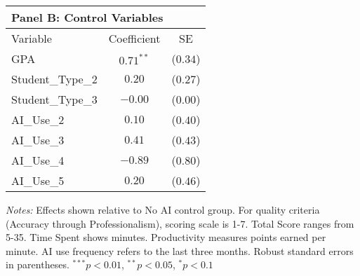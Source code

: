 \begin{table}[!htbp]
\vspace{0.3cm}

\begin{tabular}{lcc}
\multicolumn{3}{l}{\textbf{Panel B: Control Variables}} \\
\hline\hline
Variable & Coefficient & SE \\
\hline
GPA & $0.71^{**}$ & ($0.34$) \\
Student_Type_2 & $0.20$ & ($0.27$) \\
Student_Type_3 & $-0.00$ & ($0.00$) \\
AI_Use_2 & $0.10$ & ($0.40$) \\
AI_Use_3 & $0.41$ & ($0.43$) \\
AI_Use_4 & $-0.89$ & ($0.80$) \\
AI_Use_5 & $0.20$ & ($0.46$) \\
\hline
\end{tabular}
\begin{tablenotes}
\small
\item \textit{Notes:} Effects shown relative to No AI control group. For quality criteria (Accuracy through Professionalism), scoring scale is 1-7. Total Score ranges from 5-35. Time Spent shows minutes. Productivity measures points earned per minute. AI use frequency refers to the last three months. Robust standard errors in parentheses. $^{***}p<0.01$, $^{**}p<0.05$, $^{*}p<0.1$
\end{tablenotes}
\end{table}